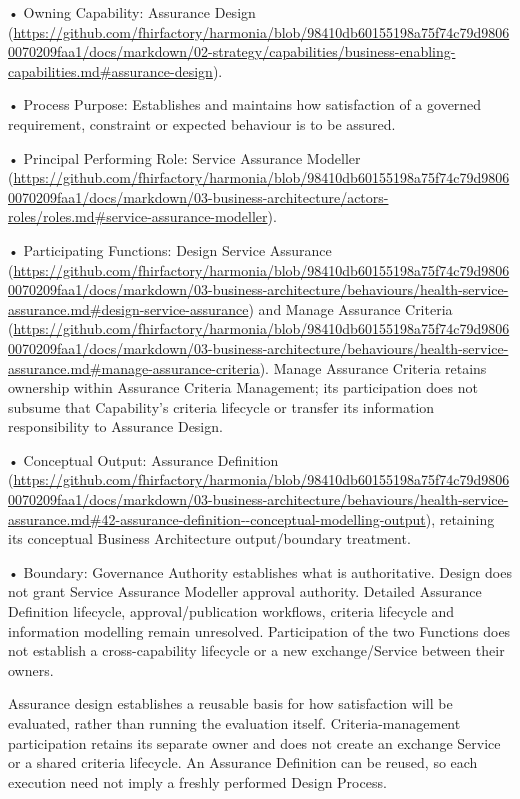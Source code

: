 •
Owning Capability: Assurance Design (\url{https://github.com/fhirfactory/harmonia/blob/98410db60155198a75f74c79d98060070209faa1/docs/markdown/02-strategy/capabilities/business-enabling-capabilities.md#assurance-design}).



•
Process Purpose: Establishes and maintains how satisfaction of a governed requirement, constraint or expected behaviour is to be assured.



•
Principal Performing Role: Service Assurance Modeller (\url{https://github.com/fhirfactory/harmonia/blob/98410db60155198a75f74c79d98060070209faa1/docs/markdown/03-business-architecture/actors-roles/roles.md#service-assurance-modeller}).



•
Participating Functions: Design Service Assurance (\url{https://github.com/fhirfactory/harmonia/blob/98410db60155198a75f74c79d98060070209faa1/docs/markdown/03-business-architecture/behaviours/health-service-assurance.md#design-service-assurance}) and Manage Assurance Criteria (\url{https://github.com/fhirfactory/harmonia/blob/98410db60155198a75f74c79d98060070209faa1/docs/markdown/03-business-architecture/behaviours/health-service-assurance.md#manage-assurance-criteria}). Manage Assurance Criteria retains ownership within Assurance Criteria Management; its participation does not subsume that Capability's criteria lifecycle or transfer its information responsibility to Assurance Design.



•
Conceptual Output: Assurance Definition (\url{https://github.com/fhirfactory/harmonia/blob/98410db60155198a75f74c79d98060070209faa1/docs/markdown/03-business-architecture/behaviours/health-service-assurance.md#42-assurance-definition--conceptual-modelling-output}), retaining its conceptual Business Architecture output/boundary treatment.



•
Boundary: Governance Authority establishes what is authoritative. Design does not grant Service Assurance Modeller approval authority. Detailed Assurance Definition lifecycle, approval/publication workflows, criteria lifecycle and information modelling remain unresolved. Participation of the two Functions does not establish a cross-capability lifecycle or a new exchange/Service between their owners.



Assurance design establishes a reusable basis for how satisfaction will be evaluated, rather than running the evaluation itself. Criteria-management participation retains its separate owner and does not create an exchange Service or a shared criteria lifecycle. An Assurance Definition can be reused, so each execution need not imply a freshly performed Design Process.


